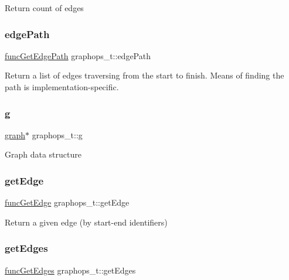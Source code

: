Return count of edges \mbox{\label{structgraphops__t_ab0fdace070db2a1fa199e920b6136a04}} 
\subsubsection{\texorpdfstring{edge\+Path}{edgePath}}
{\footnotesize\ttfamily \hyperlink{graphops_8h_ac2b0381c5a4018e52104e27c57fb5c2c}{func\+Get\+Edge\+Path} graphops\+\_\+t\+::edge\+Path}

Return a list of edges traversing from the start to finish. Means of finding the path is implementation-\/specific. \mbox{\label{structgraphops__t_ab8a78cf4f0bdfe6a65aa217a716ca537}} 
\subsubsection{\texorpdfstring{g}{g}}
{\footnotesize\ttfamily \hyperlink{graphdata_8h_ad149912e738dca1c84b3b4508382fff5}{graph}$\ast$ graphops\+\_\+t\+::g}

Graph data structure \mbox{\label{structgraphops__t_aafbe3ec7bdce040b86d7748c953cf607}} 
\subsubsection{\texorpdfstring{get\+Edge}{getEdge}}
{\footnotesize\ttfamily \hyperlink{graphops_8h_aed109d4861cfae4ea7721603770befca}{func\+Get\+Edge} graphops\+\_\+t\+::get\+Edge}

Return a given edge (by start-\/end identifiers) \mbox{\label{structgraphops__t_a87fec7e1150c05e54e34ab09fe401eaa}} 
\subsubsection{\texorpdfstring{get\+Edges}{getEdges}}
{\footnotesize\ttfamily \hyperlink{graphops_8h_af1e618623a0855f489ac957e5ae24ac0}{func\+Get\+Edges} graphops\+\_\+t\+::get\+Edges}

